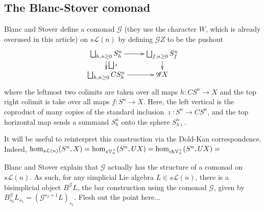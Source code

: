 \documentclass[11pt]{amsart}
\theoremstyle{plain}
\theoremstyle{definition}
\renewcommand{\to}{\longrightarrow}
\newcommand{\scrQ}{\mathscr{Q}}
\newcommand{\scrR}{\mathscr{R}}
\newcommand{\scrT}{\mathscr{T}}
\newcommand{\scrY}{\mathscr{Y}}
\newcommand{\scrI}{\mathscr{I}}
\newcommand{\scrO}{\mathscr{O}}
\newcommand{\scrP}{\mathscr{P}}
\newcommand{\scrS}{\mathscr{S}}
\newcommand{\scrG}{\mathscr{G}}
\newcommand{\scrH}{\mathscr{H}}
\newcommand{\scrJ}{\mathscr{J}}
\newcommand{\scrK}{\mathscr{K}}
\newcommand{\scrL}{\mathscr{L}}
\newcommand{\scrZ}{\mathscr{Z}}
\newcommand{\scrN}{\mathscr{N}}
\newcommand{\scrM}{\mathscr{M}}
\newcommand{\calL}{\mathcal{L}}
\newcommand{\calV}{\mathcal{V}}
\theoremstyle{plain}
\newcommand{\vect}[2]{\calV^{#1}_{#2}}
\newcommand{\BSW}{{\scrG}}%
\begin{document}
\begin{comp func sseq old version}
\subsection{The Blanc-Stover comonad}
Blanc and Stover \cite{Blanc_Stover-Groth_SS.pdf} define a comonad $\BSW$ (they use the character $W$, which is already overused in this article) on $s\calL(n)$ by defining $\BSW Z$ to be the pushout
\[\xymatrix@R=4mm{
\bigsqcup_{h,n\geq0}S^n_h
\ar[r]\ar[d]^-{\bigsqcup\imath}
&%
\bigsqcup_{f,n\geq0}S^n_f\ar[d]\\%
\bigsqcup_{h,n\geq0}CS^n_h
\ar[r]&%
\BSW X%
}\]
where the leftmost two colimits are taken over all maps $h:CS^n\to X$ and the top right colimit is take over all maps $f:S^n\to X$.
Here, the left vertical is the coproduct of many copies of the standard inclusion $\imath:S^n\to CS^n$, and the top horizontal map sends a summand $S^n_h$ onto the sphere $S^n_{h\imath}$.

It will be useful to reinterpret this construction via the Dold-Kan correspondence. Indeed, $\hom_{s\calL(n)}(S^n,X)=\hom_{s\vect{+}{n}}(S^n,UX)=\hom_{\textup{ch}\vect{+}{n}}(S^n,UX)=$

Blanc and Stover explain that $\BSW $ actually has the structure of a comonad on $s\calL(n)$. As such, for any simplicial Lie algebra $L\in s\calL(n)$, there is a bisimplicial object $B^\BSW L$, the bar construction using the comonad $\BSW $, given by $B_{s_2}^\BSW L_{s_1}=(\BSW^{s_2+1}L)_{s_1}$. Flesh out the point here...


\end{comp func sseq old version}
\end{document}
